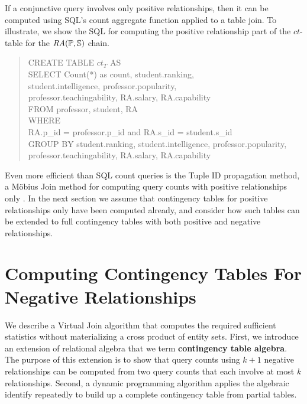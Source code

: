 \documentclass{sig-alternate-2013}
\newcommand{\ct}{\mathit{ct}}
\begin{document}
If a conjunctive query involves only positive relationships, then it can be computed using SQL's count aggregate function applied to a table join. To illustrate, we show the SQL for computing the positive relationship part of the $\ct$-table for the $\mathit{RA}(\mathbb{P},\mathbb{S})$ chain.
%
\begin{quote}
CREATE TABLE $\ct_{T}$  AS 
\\SELECT Count(*) as  count,  student.ranking, \\student.intelligence, professor.popularity,\\ professor.teachingability, RA.salary, RA.capability  \\
FROM professor, student, RA  \\
WHERE  \\RA.p\_id = professor.p\_id and RA.s\_id = student.s\_id  \\
GROUP BY student.ranking, student.intelligence, professor.popularity,  professor.teachingability, RA.salary, RA.capability
\end{quote}
Even more efficient than SQL count queries is the Tuple ID propagation method, a M\"obius Join method for computing query counts with positive relationships only \cite{Yin2004}. 
In the next section we assume that contingency tables for positive relationships only have been computed already, and consider how such tables can be extended to full contingency tables with both positive and negative relationships.




\section{Computing Contingency Tables For Negative Relationships} 


We describe a Virtual Join algorithm that computes the required sufficient statistics without  materializing a cross product of entity sets. 
First, we introduce an  extension of relational algebra that we term \textbf{contingency table algebra}. The purpose of this extension is to 
show that query counts using $k+1$ negative relationships can be computed from two query counts that each involve at most $k$ relationships. 
Second, a dynamic programming algorithm applies the algebraic identify repeatedly to build up a complete contingency table from partial tables.
\end{document}
